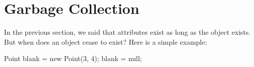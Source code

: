 \label{mutable-objects_shadowing}
%
%
%
%
%
%
%
%
%
%


\section{Garbage Collection}
\label{mutable-objects_garbage-collection}
\label{garbage}

In the previous section, we said that attributes exist as long as the object exists.
But when does an object cease to exist?
Here is a simple example:


\begin{code}
Point blank = new Point(3, 4);
blank = null;
\end{code}

